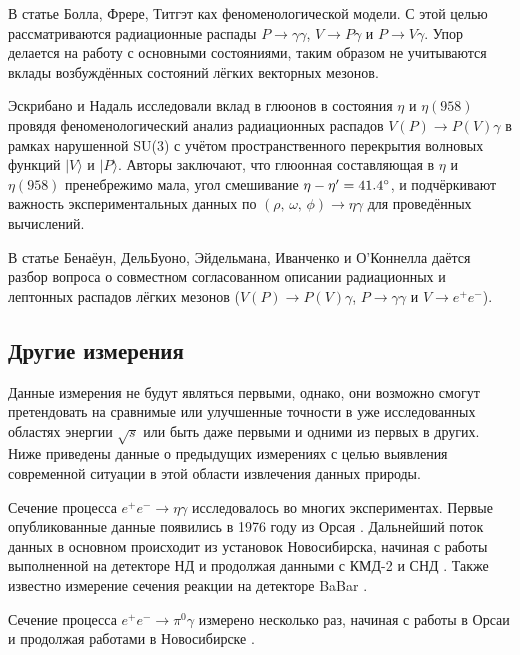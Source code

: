 В статье Болла, Фрере, Титгэт \cite{Ball:1995zv} ках феноменологической модели.%
С этой целью рассматриваются радиационные распады
$P \to \gamma \gamma$, $V \to P \gamma$ и $P \to V \gamma$. Упор
делается на работу с основными состояниями, таким образом не учитываются
вклады возбуждённых состояний лёгких векторных мезонов.

Эскрибано и Надаль \cite{Escribano:2007cd} исследовали вклад в глюонов в состояния $\eta$
и $\eta(958)$ провядя феноменологический анализ радиационных распадов
$V (P) \to P (V) \gamma$ в рамках нарушенной SU(3) с учётом
пространственного перекрытия волновых функций $| V \rangle$ и
$|P \rangle$. Авторы заключают, что глюонная составляющая в $\eta$ и
$\eta(958)$ пренебрежимо мала, угол смешивание
$\eta-\eta^\prime = \ang{41.4 \pm 1.3}$, и подчёркивают важность
экспериментальных данных по $(\rho, \, \omega, \, \phi ) \to \eta \gamma$ для
проведённых вычислений.

В статье Бенаёун, ДельБуоно, Эйдельмана, Иванченко и О'Коннелла \cite{Benayoun:1999fv} даётся разбор
вопроса о совместном согласованном описании радиационных и лептонных
распадов лёгких мезонов ($V(P) \to P(V)\gamma$, $P \to \gamma \gamma$ и
$V \to e^+ e^-$).


\subsection{Другие измерения}\label{other-measurments}

Данные измерения не будут являться первыми, однако, они возможно смогут
претендовать на сравнимые или улучшенные точности в уже исследованных
областях энергии $\sqrt{s}$ или быть даже первыми и одними из первых в
других. Ниже приведены данные о предыдущих измерениях с целью выявления
современной ситуации в этой области извлечения данных природы.

Сечение процесса $e^+e^-\to\eta\gamma$ исследовалось во многих экспериментах.
Первые опубликованные данные появились в 1976 году из Орсая \cite{Cosme:1975rs}.
Дальнейший поток данных в основном происходит из установок Новосибирска, начиная с работы выполненной на детекторе НД \cite{Druzhinin:1984zq} и продолжая данными с КМД-2 \cite{Akhmetshin:1995vz, Akhmetshin:1999zv, Akhmetshin:2001hm, Akhmetshin:2004gw} и СНД \cite{Achasov:1997nq, Achasov:2000zd, Achasov:2006dv, Achasov:2013eli}.
Также известно измерение сечения реакции на детекторе BaBar \cite{Aubert:2006cy}.

Сечение процесса $e^+e^-\to\pi^0\gamma$ измерено несколько раз, начиная с работы в Орсаи \cite{Cosme:1975rs} и продолжая работами в Новосибирске \cite{Druzhinin:1984zq, Achasov:2000zd, Achasov:2003ed, Akhmetshin:2004gw, Achasov:2016bfr}.

